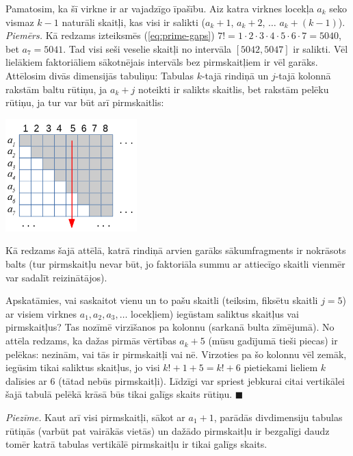 \documentclass[a4paper,12pt]{article}
\begin{document}
Pamatosim, ka šī virkne ir ar vajadzīgo īpašību. Aiz katra virknes locekļa $a_{k}$ 
seko vismaz $k-1$ naturāli skaitļi, kas visi ir salikti ($a_k + 1$, $a_k + 2$, $\ldots$ $a_k + (k-1)$).\\
{\em Piemērs.} Kā redzams izteiksmēs (\ref{eq:prime-gaps}) $7! = 1 \cdot 2 \cdot 3 \cdot 4 \cdot 5 \cdot 6 \cdot 7 = 5040$, 
bet $a_7 = 5041$. Tad visi seši veselie skaitļi no intervāla $[5042,5047]$ ir salikti. 
Vēl lielākiem faktoriāliem sākotnējais intervāls bez pirmskaitļiem ir vēl garāks. 
Attēlosim divās dimensijās tabuliņu: Tabulas $k$-tajā rindiņā un $j$-tajā kolonnā rakstām baltu rūtiņu, ja
$a_k + j$ noteikti ir salikts skaitlis, bet rakstām pelēku rūtiņu, ja tur var būt arī pirmskaitlis:

\includegraphics[width=2in]{prime-gaps.png}

Kā redzams šajā attēlā, katrā rindiņā arvien garāks sākumfragments ir nokrāsots balts (tur pirmskaitļu nevar būt, 
jo faktoriāla summu ar attiecīgo skaitli vienmēr var sadalīt reizinātājos).

Apskatāmies, vai saskaitot vienu un to pašu skaitli (teiksim, fiksētu skaitli $j = 5$) ar visiem virknes $a_1,a_2,a_3,\ldots$ 
locekļiem) iegūstam saliktus skaitļus vai pirmskaitļus? 
Tas nozīmē virzīšanos pa kolonnu (sarkanā bulta zīmējumā). No attēla redzams, ka dažas pirmās vērtības $a_k + 5$ 
(mūsu gadījumā tieši piecas) ir pelēkas: nezinām, vai tās ir pirmskaitļi vai nē. 
Virzoties pa šo kolonnu vēl zemāk, iegūsim tikai saliktus skaitļus, jo visi $k! + 1 + 5 = k! +6$ 
pietiekami lieliem $k$ dalīsies ar $6$ (tātad nebūs pirmskaitļi). Līdzīgi var spriest jebkurai 
citai vertikālei šajā tabulā \textendash{} pelēkā krāsā būs tikai galīgs skaits rūtiņu. $\blacksquare$

\vspace{5pt}
{\em Piezīme.} Kaut arī visi pirmskaitļi, sākot ar $a_1+1$, parādās divdimensiju tabulas rūtiņās (varbūt pat vairākās vietās)
un dažādo pirmskaitļu ir bezgalīgi daudz \textendash{} tomēr katrā tabulas vertikālē pirmskaitļu ir tikai galīgs skaits.
\end{document}
